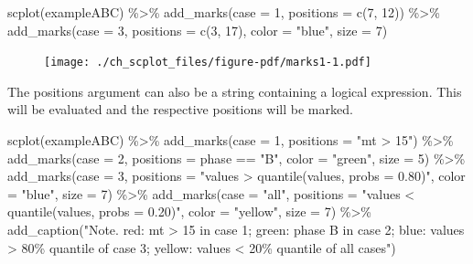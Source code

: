 \documentclass[
  letterpaper,
  DIV=11,
  numbers=noendperiod]{scrreprt}
\newenvironment{Shaded}{\begin{snugshade}}{\end{snugshade}}
\newcommand{\AttributeTok}[1]{\textcolor[rgb]{0.40,0.45,0.13}{#1}}
\newcommand{\DecValTok}[1]{\textcolor[rgb]{0.68,0.00,0.00}{#1}}
\newcommand{\FunctionTok}[1]{\textcolor[rgb]{0.28,0.35,0.67}{#1}}
\newcommand{\NormalTok}[1]{\textcolor[rgb]{0.00,0.23,0.31}{#1}}
\newcommand{\SpecialCharTok}[1]{\textcolor[rgb]{0.37,0.37,0.37}{#1}}
\newcommand{\StringTok}[1]{\textcolor[rgb]{0.13,0.47,0.30}{#1}}
\begin{document}
\begin{Shaded}
\begin{Highlighting}[]
\FunctionTok{scplot}\NormalTok{(exampleABC) }\SpecialCharTok{\%\textgreater{}\%}
  \FunctionTok{add\_marks}\NormalTok{(}\AttributeTok{case =} \DecValTok{1}\NormalTok{, }\AttributeTok{positions =} \FunctionTok{c}\NormalTok{(}\DecValTok{7}\NormalTok{, }\DecValTok{12}\NormalTok{)) }\SpecialCharTok{\%\textgreater{}\%}
  \FunctionTok{add\_marks}\NormalTok{(}\AttributeTok{case =} \DecValTok{3}\NormalTok{, }\AttributeTok{positions =} \FunctionTok{c}\NormalTok{(}\DecValTok{3}\NormalTok{, }\DecValTok{17}\NormalTok{), }\AttributeTok{color =} \StringTok{"blue"}\NormalTok{, }\AttributeTok{size =} \DecValTok{7}\NormalTok{)}
\end{Highlighting}
\end{Shaded}

\begin{figure}[H]

{\centering \texttt{[image: ./ch\_scplot\_files/figure-pdf/marks1-1.pdf]}

}

\end{figure}

The positions argument can also be a string containing a logical
expression. This will be evaluated and the respective positions will be
marked.

\begin{Shaded}
\begin{Highlighting}[]
\FunctionTok{scplot}\NormalTok{(exampleABC) }\SpecialCharTok{\%\textgreater{}\%}
  \FunctionTok{add\_marks}\NormalTok{(}\AttributeTok{case =} \DecValTok{1}\NormalTok{, }\AttributeTok{positions =} \StringTok{"mt \textgreater{} 15"}\NormalTok{) }\SpecialCharTok{\%\textgreater{}\%}
  \FunctionTok{add\_marks}\NormalTok{(}\AttributeTok{case =} \DecValTok{2}\NormalTok{, }\AttributeTok{positions =} \StringTok{\textquotesingle{}phase == "B"\textquotesingle{}}\NormalTok{, }\AttributeTok{color =} \StringTok{"green"}\NormalTok{, }\AttributeTok{size =} \DecValTok{5}\NormalTok{) }\SpecialCharTok{\%\textgreater{}\%}
  \FunctionTok{add\_marks}\NormalTok{(}\AttributeTok{case =} \DecValTok{3}\NormalTok{, }\AttributeTok{positions =} \StringTok{"values \textgreater{} quantile(values, probs = 0.80)"}\NormalTok{, }\AttributeTok{color =} \StringTok{"blue"}\NormalTok{, }\AttributeTok{size =} \DecValTok{7}\NormalTok{) }\SpecialCharTok{\%\textgreater{}\%}
  \FunctionTok{add\_marks}\NormalTok{(}\AttributeTok{case =} \StringTok{"all"}\NormalTok{, }\AttributeTok{positions =} \StringTok{"values \textless{} quantile(values, probs = 0.20)"}\NormalTok{, }\AttributeTok{color =} \StringTok{"yellow"}\NormalTok{, }\AttributeTok{size =} \DecValTok{7}\NormalTok{) }\SpecialCharTok{\%\textgreater{}\%}
  \FunctionTok{add\_caption}\NormalTok{(}\StringTok{"Note.}
\StringTok{red: mt \textgreater{} 15 in case 1; }
\StringTok{green: phase \textquotesingle{}B\textquotesingle{} in case 2; }
\StringTok{blue: values \textgreater{} 80\% quantile of case 3; }
\StringTok{yellow: values \textless{} 20\% quantile of all cases"}\NormalTok{)}
\end{Highlighting}
\end{Shaded}
\end{document}
